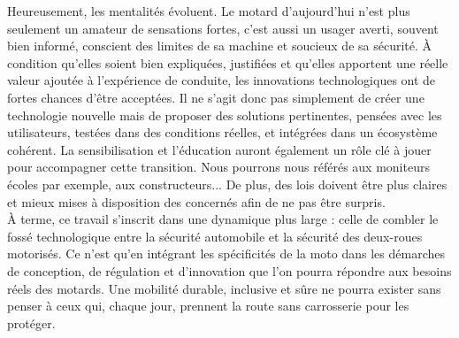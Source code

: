 Heureusement, les mentalités évoluent. Le motard d’aujourd’hui n’est plus seulement un amateur de sensations fortes, c’est aussi un usager averti, souvent bien informé, conscient des limites de sa machine et soucieux de sa sécurité. À condition qu’elles soient bien expliquées, justifiées et qu’elles apportent une réelle valeur ajoutée à l’expérience de conduite, les innovations technologiques ont de fortes chances d’être acceptées.
Il ne s’agit donc pas simplement de créer une technologie nouvelle mais de proposer des solutions pertinentes, pensées avec les utilisateurs, testées dans des conditions réelles, et intégrées dans un écosystème cohérent. La sensibilisation et l’éducation auront également un rôle clé à jouer pour accompagner cette transition. Nous pourrons nous référés aux moniteurs écoles par exemple, aux constructeurs...
De plus, des lois doivent être plus claires et mieux mises à disposition des concernés afin de ne pas être surpris.\\
À terme, ce travail s’inscrit dans une dynamique plus large : celle de combler le fossé technologique entre la sécurité automobile et la sécurité des deux-roues motorisés. Ce n’est qu’en intégrant les spécificités de la moto dans les démarches de conception, de régulation et d’innovation que l’on pourra répondre aux besoins réels des motards. Une mobilité durable, inclusive et sûre ne pourra exister sans penser à ceux qui, chaque jour, prennent la route sans carrosserie pour les protéger.